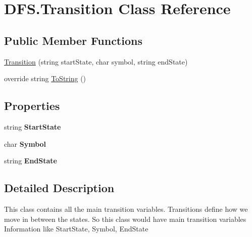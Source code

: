 \hypertarget{class_d_f_s_1_1_transition}{}\section{D\+F\+S.\+Transition Class Reference}
\label{class_d_f_s_1_1_transition}
\subsection*{Public Member Functions}
\begin{DoxyCompactItemize}
\item 
\hyperlink{class_d_f_s_1_1_transition_af7278c5be39aaa343676a27f313d1f16}{Transition} (string start\+State, char symbol, string end\+State)
\item 
override string \hyperlink{class_d_f_s_1_1_transition_ab22b2cfbafaf159e34f8b7c50613b5f9}{To\+String} ()
\end{DoxyCompactItemize}
\subsection*{Properties}
\begin{DoxyCompactItemize}
\item 
\hypertarget{class_d_f_s_1_1_transition_a75c5b6955b056742de5d09352f077958}{}string {\bfseries Start\+State}\label{class_d_f_s_1_1_transition_a75c5b6955b056742de5d09352f077958}

\item 
\hypertarget{class_d_f_s_1_1_transition_a22dd2f5a91d7b0570d3ca510722e289f}{}char {\bfseries Symbol}\label{class_d_f_s_1_1_transition_a22dd2f5a91d7b0570d3ca510722e289f}

\item 
\hypertarget{class_d_f_s_1_1_transition_ac9eaf4d455236c134d7e99cf9acd83ed}{}string {\bfseries End\+State}\label{class_d_f_s_1_1_transition_ac9eaf4d455236c134d7e99cf9acd83ed}

\end{DoxyCompactItemize}


\subsection{Detailed Description}
This class contains all the main transition variables. Transitions define how we move in between the states. So this class would have main transition variables Information like Start\+State, Symbol, End\+State 

